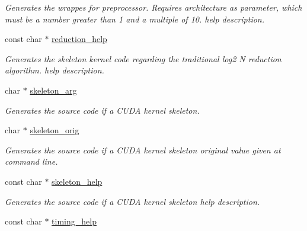\begin{DoxyCompactItemize}
\begin{DoxyCompactList}\small\item\em Generates the wrappes for preprocessor. Requires architecture as parameter, which must be a number greater than 1 and a multiple of 10. help description. \end{DoxyCompactList}\item 
\hypertarget{structgengetopt__args__info_a79f3e96904b3070cdad5b2d43c710e17}{const char $\ast$ \hyperlink{structgengetopt__args__info_a79f3e96904b3070cdad5b2d43c710e17}{reduction\-\_\-help}}\label{structgengetopt__args__info_a79f3e96904b3070cdad5b2d43c710e17}

\begin{DoxyCompactList}\small\item\em Generates the skeleton kernel code regarding the traditional log2 N reduction algorithm. help description. \end{DoxyCompactList}\item 
\hypertarget{structgengetopt__args__info_a439b7eb5f1030565ed2b13d74bc21515}{char $\ast$ \hyperlink{structgengetopt__args__info_a439b7eb5f1030565ed2b13d74bc21515}{skeleton\-\_\-arg}}\label{structgengetopt__args__info_a439b7eb5f1030565ed2b13d74bc21515}

\begin{DoxyCompactList}\small\item\em Generates the source code if a C\-U\-D\-A kernel skeleton. \end{DoxyCompactList}\item 
\hypertarget{structgengetopt__args__info_ace60ca6c4b0fd2713350017d45c303cf}{char $\ast$ \hyperlink{structgengetopt__args__info_ace60ca6c4b0fd2713350017d45c303cf}{skeleton\-\_\-orig}}\label{structgengetopt__args__info_ace60ca6c4b0fd2713350017d45c303cf}

\begin{DoxyCompactList}\small\item\em Generates the source code if a C\-U\-D\-A kernel skeleton original value given at command line. \end{DoxyCompactList}\item 
\hypertarget{structgengetopt__args__info_aead758f5bed48457225dc30f5d98224f}{const char $\ast$ \hyperlink{structgengetopt__args__info_aead758f5bed48457225dc30f5d98224f}{skeleton\-\_\-help}}\label{structgengetopt__args__info_aead758f5bed48457225dc30f5d98224f}

\begin{DoxyCompactList}\small\item\em Generates the source code if a C\-U\-D\-A kernel skeleton help description. \end{DoxyCompactList}\item 
\hypertarget{structgengetopt__args__info_aebd149956ef62ec1778712d65c28aec9}{const char $\ast$ \hyperlink{structgengetopt__args__info_aebd149956ef62ec1778712d65c28aec9}{timing\-\_\-help}}\label{structgengetopt__args__info_aebd149956ef62ec1778712d65c28aec9}


\end{DoxyCompactItemize}
